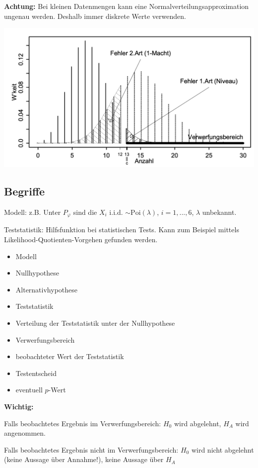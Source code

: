\textbf{Achtung:} Bei kleinen Datenmengen kann eine Normalverteilungsapproximation ungenau werden. Deshalb immer diskrete Werte verwenden.

\includegraphics[width=.8\textwidth]{images/normal.png}

\subsection{Begriffe}

Modell: z.B. Unter $P_\varphi$ sind die $X_i$ i.i.d. $\sim\text{Poi}(\lambda)$, $i=1, ..., 6$, $\lambda$ unbekannt.

Teststatistik: Hilfsfunktion bei statistischen Tests. Kann zum Beispiel mittels Likelihood-Quotienten-Vorgehen gefunden werden.


\begin{itemize}
	\item Modell
	\item Nullhypothese
	\item Alternativhypothese
	\item Teststatistik
	\item Verteilung der Teststatistik unter der Nullhypothese
	\item Verwerfungsbereich
	\item beobachteter Wert der Teststatistik
	\item Testentscheid
	\item eventuell $p$-Wert
\end{itemize}

\textbf{Wichtig:}

Falls beobachtetes Ergebnis im Verwerfungsbereich: $H_0$ wird abgelehnt, $H_A$ wird angenommen.

Falls beobachtetes Ergebnis nicht im Verwerfungsbereich: $H_0$ wird nicht abgelehnt (keine Aussage über Annahme!), keine Aussage über $H_A$\\


